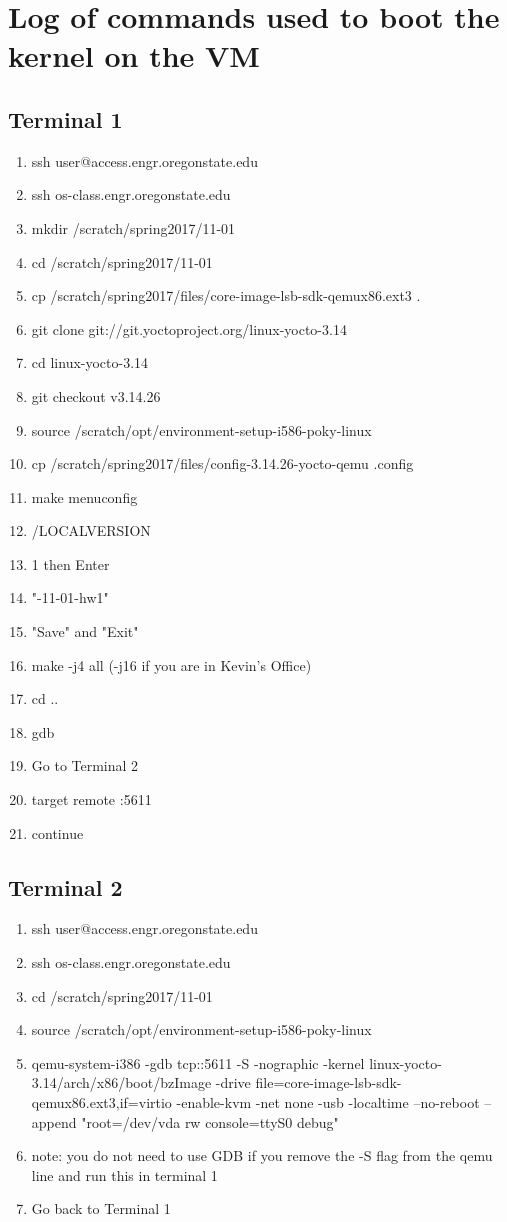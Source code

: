 \documentclass{article}
\begin{document}
\section*{Log of commands used to boot the kernel on the VM}
\subsection*{Terminal 1}
\begin{enumerate}
\item ssh user@access.engr.oregonstate.edu
\item ssh os-class.engr.oregonstate.edu
\item mkdir /scratch/spring2017/11-01
\item cd /scratch/spring2017/11-01
\item cp  /scratch/spring2017/files/core-image-lsb-sdk-qemux86.ext3 . 
\item git clone git://git.yoctoproject.org/linux-yocto-3.14
\item cd linux-yocto-3.14
\item git checkout v3.14.26 
\item source /scratch/opt/environment-setup-i586-poky-linux
\item cp /scratch/spring2017/files/config-3.14.26-yocto-qemu .config
\item make menuconfig
\item /LOCALVERSION
\item 1 then Enter
\item "-11-01-hw1"
\item "Save" and "Exit"
\item make -j4 all (-j16 if you are in Kevin's Office)
\item cd ..
\item gdb
\item Go to Terminal 2
\item target remote :5611
\item continue
\end{enumerate}

\subsection*{Terminal 2}
\begin{enumerate}
\item ssh user@access.engr.oregonstate.edu
\item ssh os-class.engr.oregonstate.edu
\item cd /scratch/spring2017/11-01
\item source /scratch/opt/environment-setup-i586-poky-linux
\item qemu-system-i386 -gdb tcp::5611 -S -nographic -kernel linux-yocto-3.14/arch/x86/boot/bzImage  -drive file=core-image-lsb-sdk-qemux86.ext3,if=virtio -enable-kvm -net none -usb -localtime --no-reboot --append "root=/dev/vda rw console=ttyS0 debug"
\item note: you do not need to use GDB if you remove the -S flag from the qemu line and run this in terminal 1
\item Go back to Terminal 1
\end{enumerate}
\end{document}
